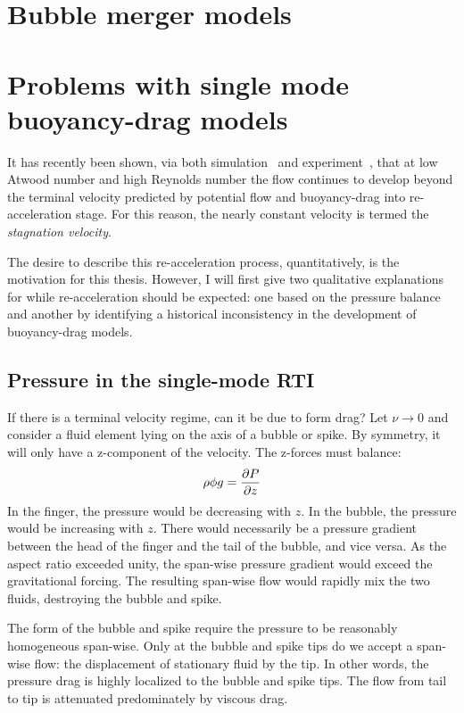 \section{Bubble merger models}

\section{Problems with single mode buoyancy-drag models}

It has recently been shown, via both simulation~\cite{Ramaprabhu2006} and experiment~\cite{Wilkinson2007}, that at low Atwood number and high Reynolds number the flow continues to develop beyond the terminal velocity predicted by potential flow and buoyancy-drag into re-acceleration stage.
For this reason, the nearly constant velocity is termed the \textit{stagnation velocity}.

The desire to describe this re-acceleration process, quantitatively, is the motivation for this thesis.
However, I will first give two qualitative explanations for while re-acceleration should be expected: one based on the pressure balance and another by identifying a historical inconsistency in the development of buoyancy-drag models.

\subsection{Pressure in the single-mode RTI}

If there is a terminal velocity regime, can it be due to form drag?
Let $\nu \rightarrow 0$ and consider a fluid element lying on the axis
of a bubble or spike.
By symmetry, it will only have a z-component of the velocity.
The z-forces must balance:
$$ \rho \phi g = \frac{\partial P}{\partial z} $$
In the finger, the pressure would be decreasing with $z$.
In the bubble, the pressure would be increasing with $z$.
There would necessarily be a pressure gradient between the head of the finger and the tail of the bubble, and vice versa.
As the aspect ratio exceeded unity, the span-wise pressure gradient would exceed the gravitational forcing.
The resulting span-wise flow would rapidly mix the two fluids, destroying the bubble and spike.

The form of the bubble and spike require the pressure to be reasonably homogeneous span-wise.
Only at the bubble and spike tips do we accept a span-wise flow: the displacement of stationary fluid by the tip.
In other words, the pressure drag is highly localized to the bubble and spike tips.
The flow from tail to tip is attenuated predominately by viscous drag.

